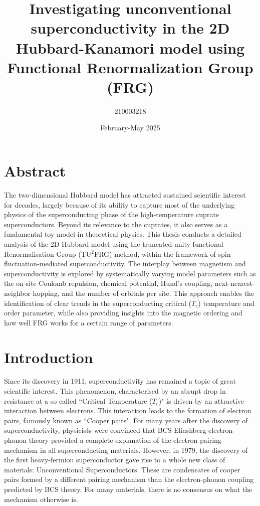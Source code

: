 \documentclass[12pt]{article}
\title{Investigating unconventional superconductivity in the 2D Hubbard-Kanamori model using Functional Renormalization Group (FRG)}
\author{210003218}
\date{February-May 2025}
\begin{document}
\maketitle
\tableofcontents 

\newpage 

\section{Abstract}



The two-dimensional Hubbard model has attracted sustained scientific interest for decades, largely because of its ability to capture most of the underlying physics of the superconducting phase of the high-temperature cuprate superconductors\cite{dagotto1994correlated}. 
Beyond its relevance to the cuprates, it also serves as a fundamental toy model in theoretical physics. 
This thesis conducts a detailed analysis of the 2D Hubbard model using the truncated-unity functional Renormalisation Group (TU$^2$FRG) method,
within the framework of spin-fluctuation-mediated superconductivity.  The interplay between magnetism and superconductivity is explored 
by systematically varying model parameters such as the on-site Coulomb repulsion, chemical potential, Hund's coupling, next-nearest-neighbor hopping, and the number of orbitals per
site. This approach enables the identification of clear trends in the superconducting critical ($T_c$) temperature and order parameter, while also
providing insights into the magnetic ordering and how well FRG works for a certain range of parameters.







\section{Introduction}

Since its discovery in 1911\cite{onnes1911superconductivity}, superconductivity has remained a topic of great scientific interest.
This phenomenon, characterised by an abrupt drop in resistance at a so-called ``Critical Temperature ($T_c$)"\cite{geballe2015tc} is driven by an attractive interaction
between electrons. This  interaction leads to the formation of electron pairs, famously known as ``Cooper pairs"\cite{schrieffer2018theory}. For many 
years after the discovery of superconductivity, physicists
were convinced that BCS-Eliashberg-electron-phonon theory \cite{schrieffer2018theory} provided a complete explanation of the electron pairing mechanism in all superconducting materials. 
However, in 1979, the discovery of the first heavy-fermion superconductor\cite{steglich1979superconductivity} gave rise to a whole new class of materials: Unconventional Superconductors. 
These are condensates of cooper pairs formed by a different pairing mechanism than the electron-phonon coupling predicted by BCS theory\cite{hirsch2015superconducting}.
For many materials, there is no consensus on what the mechanism otherwise is.\par
\end{document}
